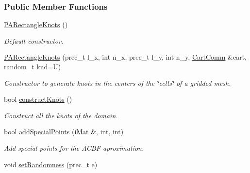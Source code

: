 \subsubsection*{Public Member Functions}
\begin{CompactItemize}
\item 
\hypertarget{classPARectangleKnots_75ff8cb31237aa412323c5c9d3b9e8a8}{
\hyperlink{classPARectangleKnots_75ff8cb31237aa412323c5c9d3b9e8a8}{PARectangleKnots} ()}
\label{classPARectangleKnots_75ff8cb31237aa412323c5c9d3b9e8a8}

\begin{CompactList}\small\item\em Default constructor. \item\end{CompactList}\item 
\hyperlink{classPARectangleKnots_d44ccc812d35593e03ed4fd60f82e1f1}{PARectangleKnots} (prec\_\-t l\_\-x, int n\_\-x, prec\_\-t l\_\-y, int n\_\-y, \hyperlink{classCartComm}{CartComm} \&cart, random\_\-t knd=U)
\begin{CompactList}\small\item\em Constructor to generate knots in the centers of the \char`\"{}cells\char`\"{} of a gridded mesh. \item\end{CompactList}\item 
bool \hyperlink{classPARectangleKnots_3e8981078e760ca21870882bb3192846}{constructKnots} ()
\begin{CompactList}\small\item\em Construct all the knots of the domain. \item\end{CompactList}\item 
bool \hyperlink{classPARectangleKnots_62651b106b9813558bd5c715454100bd}{addSpecialPoints} (\hyperlink{Traits_8hpp_a667f32088e1c93b532a640fe84dc4cd}{iMat} \&, int, int)
\begin{CompactList}\small\item\em Add special points for the ACBF aproximation. \item\end{CompactList}\item 
\hypertarget{classPARectangleKnots_8d4a61a5fdb0a157595af26dee8a745c}{
void \hyperlink{classPARectangleKnots_8d4a61a5fdb0a157595af26dee8a745c}{setRandomness} (prec\_\-t e)}
\label{classPARectangleKnots_8d4a61a5fdb0a157595af26dee8a745c}


\end{CompactItemize}
